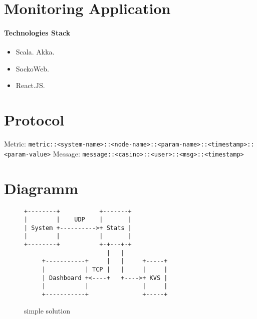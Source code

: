 \section{Monitoring Application}

\paragraph{Technologies Stack}

\begin{itemize}
    \item Scala. Akka.
    \item SockoWeb.
    \item React.JS.
\end{itemize}

\section*{Protocol}

Metric: 
  \verb|metric::<system-name>::<node-name>::<param-name>::<timestamp>::<param-value>|
Message:
  \verb|message::<casino>::<user>::<msg>::<timestamp>|

\section*{Diagramm}

\begin{figure}
\begin{verbatim}
+--------+           +-------+          
|        |    UDP    |       |          
| System +---------->+ Stats |          
|        |           |       |          
+--------+           +-+---+-+          
                       |   |            
     +-----------+     |   |     +-----+
     |           | TCP |   |     |     |
     | Dashboard +<----+   +---->+ KVS |
     |           |               |     |
     +-----------+               +-----+
\end{verbatim}
\caption{simple solution}
\label{fig:ascii-box}
\end{figure}
